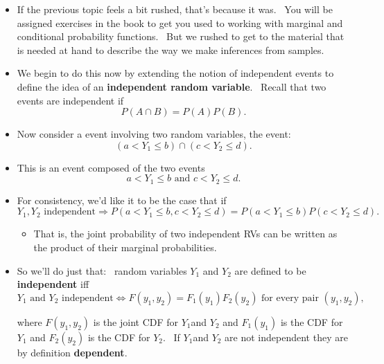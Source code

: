 \documentclass[11pt]{article}
\begin{document}
\begin{itemize}
\item If the previous topic feels a bit rushed, that's because it was. \ You
will be assigned exercises in the book to get you used to working with
marginal and conditional probability functions. \ But we rushed to get to
the material that is needed at hand to describe the way we make inferences
from samples.

\item We begin to do this now by extending the notion of independent events
to define the idea of an \textbf{independent random variable}. \ Recall that
two events are independent if 
\begin{equation*}
P(A\cap B)=P(A)P(B).
\end{equation*}

\item Now consider a event involving two random variables, the event: 
\begin{equation*}
(a<Y_{1}\leq b)\cap (c<Y_{2}\leq d).
\end{equation*}

\item This is an event composed of the two events%
\begin{equation*}
a<Y_{1}\leq b\text{ and }c<Y_{2}\leq d.
\end{equation*}

\item For consistency, we'd like it to be the case that if 
\begin{equation*}
Y_{1},Y_{2}\text{ independent}\Rightarrow P(a<Y_{1}\leq b,c<Y_{2}\leq
d)=P(a<Y_{1}\leq b)P(c<Y_{2}\leq d).
\end{equation*}

\begin{itemize}
\item That is, the joint probability of two independent RVs can be written
as the product of their marginal probabilities.
\end{itemize}

\item So we'll do just that: \ random variables $Y_{1}$ and $Y_{2}$ are
defined to be \textbf{independent} iff%
\begin{equation*}
Y_{1}\text{ and }Y_{2}\text{ independent}\Leftrightarrow
F(y_{1},y_{2})=F_{1}(y_{1})F_{2}(y_{2})\text{ for every pair }(y_{1},y_{2})%
\text{,}
\end{equation*}

where $F(y_{1},y_{2})$ is the joint CDF for $Y_{1}$and $Y_{2}$ and $%
F_{1}(y_{1})$ is the CDF for $Y_{1}$ and $F_{2}(y_{2})$ is the CDF for $%
Y_{2}.$ \ If $Y_{1}$and $Y_{2}$ are not independent they are by definition 
\textbf{dependent}.


\end{itemize}
\end{document}
